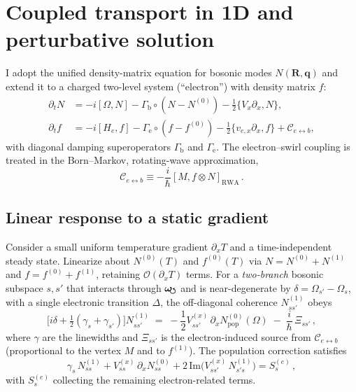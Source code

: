 \documentclass[aps,prb,preprint,amsmath,amssymb]{revtex4-2} %
\newcommand{\omegas}{\boldsymbol{\omega}_{\!\mkern-2mu\scriptstyle\boldsymbol{\circlearrowleft}}} %
\begin{document}
    \section{Coupled transport in 1D and perturbative solution}
        I adopt the unified density-matrix equation for bosonic modes $N(\mathbf R,\mathbf q)$ \cite{Simoncelli2019Unified} and extend it to a charged two-level system (``electron'') with density matrix $f$:
        \begin{align}
            \partial_t N &= -i[\Omega,N] - \Gamma_\mathrm{b} \circ (N-N^{(0)}) - \tfrac12\{ V_x \partial_x, N\},\label{eq:Ndyn}\\
            \partial_t f &= -i[H_e,f] - \Gamma_\mathrm{e}\circ(f-f^{(0)}) - \tfrac12\{ v_{e,x}\partial_x, f\} + \mathcal C_{e\leftrightarrow b},\label{eq:fdyn}
        \end{align}
        with diagonal damping superoperators $\Gamma_\mathrm{b}$ and $\Gamma_\mathrm{e}$. The electron--swirl coupling is treated in the Born--Markov, rotating-wave approximation,
        \begin{equation}
            \mathcal C_{e\leftrightarrow b} \equiv -\frac{i}{\hbar}[M, f\otimes N]_{\mathrm{RWA}}\,.
        \end{equation}

        \subsection{Linear response to a static gradient}
            Consider a small uniform temperature gradient $\partial_x T$ and a time-independent steady state. Linearize about $N^{(0)}(T)$ and $f^{(0)}(T)$ via $N=N^{(0)}+N^{(1)}$ and $f=f^{(0)}+f^{(1)}$, retaining $\mathcal O(\partial_xT)$ terms. For a \emph{two-branch} bosonic subspace $s,s'$ that interacts through $\omegas$ and is near-degenerate by $\delta=\Omega_{s'}-\Omega_s$, with a single electronic transition $\Delta$, the off-diagonal coherence $N^{(1)}_{ss'}$ obeys
            \begin{equation}
                \Big[i\delta + \tfrac12(\gamma_s+\gamma_{s'})\Big] N^{(1)}_{ss'}
                \;=\; -\frac{1}{2} V^{(x)}_{ss'}\, \partial_x N^{(0)}_{\mathrm{pop}}(\Omega) \; -\; \frac{i}{\hbar}\,\Xi_{ss'}\,,
                \label{eq:Noff}
            \end{equation}
            where $\gamma$ are the linewidths and $\Xi_{ss'}$ is the electron-induced source from $\mathcal C_{e\leftrightarrow b}$ (proportional to the vertex $M$ and to $f^{(1)}$). The population correction satisfies
            \begin{equation}
                \gamma_s\, N^{(1)}_{ss} + V^{(x)}_{ss}\,\partial_x N^{(0)}_{ss} + 2\,\mathrm{Im}\!\big( V^{(x)}_{ss'}\,N^{(1)}_{s's}\big) = S^{(e)}_s\,,
                \label{eq:Ndiag}
            \end{equation}
            with $S^{(e)}_s$ collecting the remaining electron-related terms.
\end{document}
